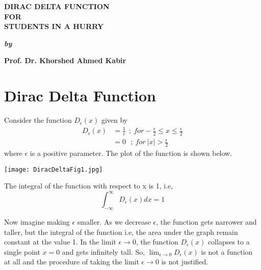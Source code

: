 

\begin{titlepage}
\begin{center}
        
\vspace*{5cm}
        
\Huge
\textbf{DIRAC DELTA FUNCTION \\ FOR \\ STUDENTS IN A HURRY}

\vspace*{1cm}

\large
\textbf{\textit{by}}

\vspace*{1cm}
\Large
\textbf{Prof. Dr. Khorshed Ahmed Kabir}

\end{center}

\end{titlepage}



\section*{Dirac Delta Function}
Consider the function $D_\epsilon (x)$ given by 
\begin{align*}
D_\epsilon (x) & = \frac{1}{\epsilon} \ \ ;\ for -\frac{\epsilon}{2} \leq x \leq \frac{\epsilon}{2} \\
& = 0 \ \ \ ;\ for \ |x| > \frac{\epsilon}{2}
\end{align*}
where $\epsilon$ is a positive parameter. The plot of the function is shown below.

\vspace{0.2cm}
\begin{center}
\texttt{[image: DiracDeltaFig1.jpg]}
\end{center}

The integral of the function with respect to x is 1, i.e,
\begin{equation}
\int_{-\infty}^\infty D_\epsilon (x) dx = 1 
\end{equation}

Now imagine making $\epsilon$ smaller. As we decrease $\epsilon$, the function gets narrower and taller, but the integral of the function i.e, the area under the graph remain constant at the value 1. In the limit $\epsilon \to 0$, the function $D_{\epsilon} (x)$ collapses to a single point $x=0$ and gets infinitely tall. So, $\lim_{\epsilon \to 0} D_\epsilon (x)$ is not a function at all and the procedure of taking the limit $\epsilon \to 0$ is not justified.\\


